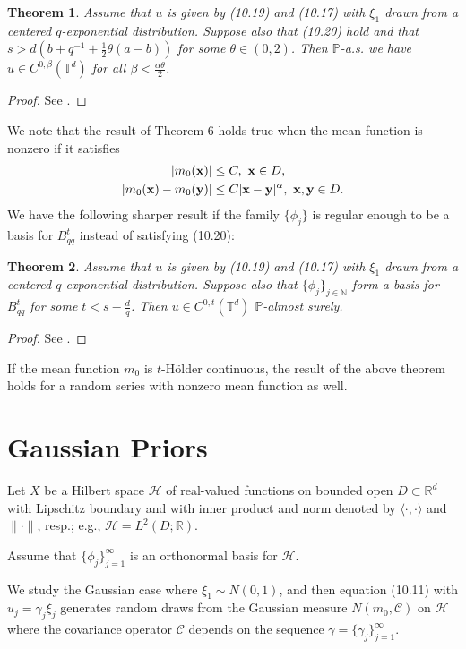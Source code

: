 \documentclass[oneside,11pt]{book}
\numberwithin{equation}{section}
\newtheorem{theorem}{Theorem}[section]
\begin{document}
\begin{theorem}
    Assume that $u$ is given by (10.19) and (10.17) with $\xi_1$ drawn from a centered $q$-exponential distribution. Suppose also that (10.20) hold and that $s > d(b + q^{-1} + \frac{1}{2}\theta(a - b))$ for some $\theta\in(0,2)$. Then $\mathbb{P}$-a.s. we have $u\in C^{0,\beta}(\mathbb{T}^d)$ for all $\beta < \frac{\alpha\theta}{2}$.
\end{theorem}

\begin{proof}
    See \cite[p. 329]{Dashti_Stuart2017}.
\end{proof}
We note that the result of Theorem 6 holds true when the mean function is nonzero if it satisfies
\begin{align*}
    |m_0({\bf x})|&\le C,\ {\bf x}\in D,\\
    |m_0({\bf x}) - m_0({\bf y})|&\le C|{\bf x} - {\bf y}|^\alpha,\ {\bf x},{\bf y}\in D.
\end{align*}
We have the following sharper result if the family $\{\phi_j\}$ is regular enough to be a basis for $B_{qq}^t$ instead of satisfying (10.20):

\begin{theorem}
    Assume that $u$ is given by (10.19) and (10.17) with $\xi_1$ drawn from a centered $q$-exponential distribution. Suppose also that $\{\phi_j\}_{j\in\mathbb{N}}$ form a basis for $B_{qq}^t$ for some $t < s - \frac{d}{q}$. Then $u\in C^{0,t}(\mathbb{T}^d)$ $\mathbb{P}$-almost surely.
\end{theorem}

\begin{proof}
    See \cite[p. 329]{Dashti_Stuart2017}.
\end{proof}
If the mean function $m_0$ is $t$-H\"older continuous, the result of the above theorem holds for a random series with nonzero mean function as well.

\section{Gaussian Priors}
Let $X$ be a Hilbert space $\mathcal{H}$ of real-valued functions on bounded open $D\subset\mathbb{R}^d$ with Lipschitz boundary and with inner product and norm denoted by $\langle\cdot,\cdot\rangle$ and $\|\cdot\|$, resp.; e.g., $\mathcal{H} = L^2(D;\mathbb{R})$.

Assume that $\{\phi_j\}_{j=1}^\infty$ is an orthonormal basis for $\mathcal{H}$.

We study the Gaussian case where $\xi_1\sim N(0,1)$, and then equation (10.11) with $u_j = \gamma_j\xi_j$ generates random draws from the Gaussian measure $N(m_0,\mathcal{C})$ on $\mathcal{H}$ where the covariance operator $\mathcal{C}$ depends on the sequence $\gamma = \{\gamma_j\}_{j=1}^\infty$.
\end{document}
